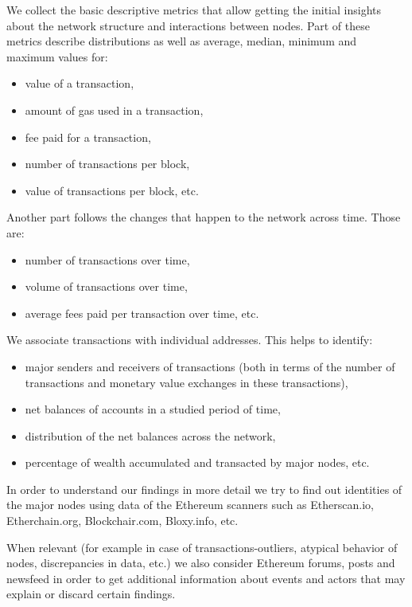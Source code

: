We collect the basic descriptive metrics that allow getting the initial insights about the network structure and interactions between nodes.
Part of these metrics describe distributions as well as average, median, minimum and maximum values for:
\begin{itemize}
	\item value of a transaction,
	\item amount of gas used in a transaction,
	\item fee paid for a transaction,
	\item number of transactions per block,
	\item value of transactions per block, etc.
\end{itemize}

Another part follows the changes that happen to the network across time. Those are:
\begin{itemize}
	\item number of transactions over time,
	\item volume of transactions over time,
	\item average fees paid per transaction over time, etc.
\end{itemize}

We associate transactions with individual addresses.
This helps to identify:
\begin{itemize}
	\item major senders and receivers of transactions (both in terms of the number of transactions and monetary value exchanges in these transactions),
	\item net balances of accounts in a studied period of time,
	\item distribution of the net balances across the network,
	\item percentage of wealth accumulated and transacted by major nodes, etc.
\end{itemize}

In order to understand our findings in more detail we try to find out identities of the major nodes using data of the Ethereum scanners such as Etherscan.io, Etherchain.org, Blockchair.com, Bloxy.info, etc.

When relevant (for example in case of transactions-outliers, atypical behavior of nodes, discrepancies in data, etc.) we also consider Ethereum forums, posts and newsfeed in order to get additional information about events and actors that may explain or discard certain findings.